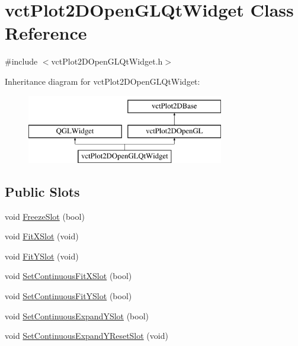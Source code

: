 \hypertarget{classvct_plot2_d_open_g_l_qt_widget}{\section{vct\-Plot2\-D\-Open\-G\-L\-Qt\-Widget Class Reference}
\label{classvct_plot2_d_open_g_l_qt_widget}
}


{\ttfamily \#include $<$vct\-Plot2\-D\-Open\-G\-L\-Qt\-Widget.\-h$>$}

Inheritance diagram for vct\-Plot2\-D\-Open\-G\-L\-Qt\-Widget\-:\begin{figure}[H]
\begin{center}
\leavevmode
\includegraphics[height=3.000000cm]{d5/dc9/classvct_plot2_d_open_g_l_qt_widget}
\end{center}
\end{figure}
\subsection*{Public Slots}
\begin{DoxyCompactItemize}
\item 
void \hyperlink{classvct_plot2_d_open_g_l_qt_widget_a591ce1a2b895f3057462a57bfde32ede}{Freeze\-Slot} (bool)
\item 
void \hyperlink{classvct_plot2_d_open_g_l_qt_widget_a060bd8dab2f9dae6aa0d31444187e35d}{Fit\-X\-Slot} (void)
\item 
void \hyperlink{classvct_plot2_d_open_g_l_qt_widget_a28388e00a0069dbefcc351761f8a17f5}{Fit\-Y\-Slot} (void)
\item 
void \hyperlink{classvct_plot2_d_open_g_l_qt_widget_ae037064d590d6566c16c55651619bd77}{Set\-Continuous\-Fit\-X\-Slot} (bool)
\item 
void \hyperlink{classvct_plot2_d_open_g_l_qt_widget_aabf83d45db3de342269a3394a0a895cf}{Set\-Continuous\-Fit\-Y\-Slot} (bool)
\item 
void \hyperlink{classvct_plot2_d_open_g_l_qt_widget_afe4bac2aae71a08ad5ee96f4910a10c5}{Set\-Continuous\-Expand\-Y\-Slot} (bool)
\item 
void \hyperlink{classvct_plot2_d_open_g_l_qt_widget_a2bc31c056ccf0bddfe4cbd708e70fd44}{Set\-Continuous\-Expand\-Y\-Reset\-Slot} (void)
\end{DoxyCompactItemize}
